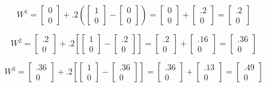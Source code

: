 \documentclass[fontsize=11bp, paper=a4]{scrarticle}
\begin{document}
$$
W^1 = \begin{bmatrix} 0 \\ 0 \end{bmatrix} + .2(\begin{bmatrix} 1 \\ 0 \end{bmatrix} - \begin{bmatrix} 0 \\ 0 \end{bmatrix}) = \begin{bmatrix} 0 \\ 0 \end{bmatrix} + \begin{bmatrix} .2 \\ 0 \end{bmatrix} = \begin{bmatrix} .2 \\ 0 \end{bmatrix}
$$

$$
W^2 = \begin{bmatrix} .2 \\ 0 \end{bmatrix} + .2[\begin{bmatrix} 1 \\ 0 \end{bmatrix} - \begin{bmatrix} .2 \\ 0 \end{bmatrix}] = \begin{bmatrix} .2 \\ 0 \end{bmatrix} + \begin{bmatrix} .16 \\ 0 \end{bmatrix} = \begin{bmatrix} .36 \\ 0 \end{bmatrix}
$$

$$
W^3 = \begin{bmatrix} .36 \\ 0 \end{bmatrix} + .2[\begin{bmatrix} 1 \\ 0 \end{bmatrix} - \begin{bmatrix} .36 \\ 0 \end{bmatrix}] = \begin{bmatrix} .36 \\ 0 \end{bmatrix} + \begin{bmatrix} .13 \\ 0 \end{bmatrix} = \begin{bmatrix} .49 \\ 0 \end{bmatrix}
$$
\end{document}
